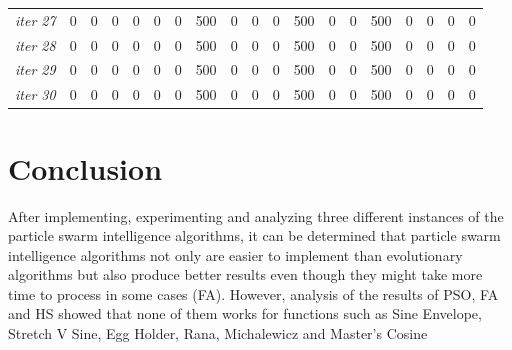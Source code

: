 \documentclass[12pt]{article}
\begin{document}
\begin{table}[ht]
{\begin{tabular}{lllllllllllllllllll}
							{\textit{iter 27}} &   0 &   0 &   0 &   0 &   0 &   0 & 500 &   0 &   0 &   0 & 500 &   0 &   0 & 500 &   0 &   0 &   0 &   0 \\ 
							{\textit{iter 28}} &   0 &   0 &   0 &   0 &   0 &   0 & 500 &   0 &   0 &   0 & 500 &   0 &   0 & 500 &   0 &   0 &   0 &   0 \\ 
							{\textit{iter 29}} &   0 &   0 &   0 &   0 &   0 &   0 & 500 &   0 &   0 &   0 & 500 &   0 &   0 & 500 &   0 &   0 &   0 &   0 \\ 
							{\textit{iter 30}} &   0 &   0 &   0 &   0 &   0 &   0 & 500 &   0 &   0 &   0 & 500 &   0 &   0 & 500 &   0 &   0 &   0 &   0 \\ 
							\hline
						\end{tabular}
					}
				\end{table}
					
					
		\section{Conclusion}
			After implementing, experimenting and analyzing three different instances of the particle swarm intelligence algorithms, it can be determined that particle swarm intelligence algorithms not only are easier to implement than evolutionary algorithms but also produce better results even though they might take more time to process in some cases (FA). However, analysis of the results of PSO, FA and HS showed that none of them works for functions such as Sine Envelope, Stretch V Sine, Egg Holder, Rana, Michalewicz and Master's Cosine
			
\end{document}
